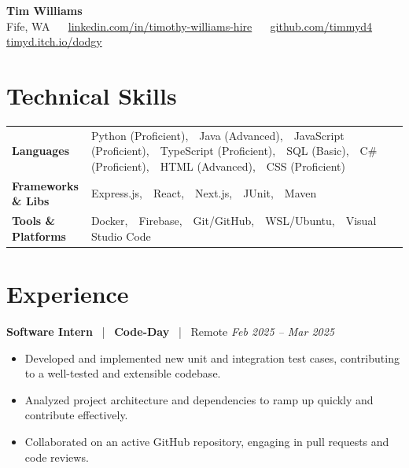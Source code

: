 \documentclass[10pt, letterpaper]{article}
\newcommand{\jobhead}[4]{%
  \vspace{5pt}%
  {\bfseries\color{dark}#1}%
  ~{\color{light}|}~%
  {\bfseries\color{navy}#2}%
  ~{\color{light}|}~%
  {\color{light}#3}%
  \hfill{\color{light}\small\textit{#4}}\\[-2pt]%
}
\newcommand{\skillrow}[2]{%
  {\bfseries #1} & #2 \\[2pt]%
}
\begin{document}

\begin{center}
  {\huge\bfseries\color{navy} Tim Williams}\\[4pt]
  {\small\color{light}
    Fife, WA
    ~\textbullet~
    \href{https://linkedin.com/in/timothy-williams-hire}{linkedin.com/in/timothy-williams-hire}
    ~\textbullet~
    \href{https://github.com/timmyd4}{github.com/timmyd4}
    ~\textbullet~
    \href{https://timyd.itch.io/dodgy}{timyd.itch.io/dodgy}
  }
\end{center}

\vspace{2pt}

\section{Technical Skills}

\begin{tabular}{@{}p{1.6in} p{5.2in}@{}}
  \skillrow{Languages}{Python (Proficient),\ \ Java (Advanced),\ \ JavaScript (Proficient),\ \ TypeScript (Proficient),\ \ SQL (Basic),\ \ C\# (Proficient),\ \ HTML (Advanced),\ \ CSS (Proficient)}
  \skillrow{Frameworks \& Libs}{Express.js,\ \ React,\ \ Next.js,\ \ JUnit,\ \ Maven}
  \skillrow{Tools \& Platforms}{Docker,\ \ Firebase,\ \ Git/GitHub,\ \ WSL/Ubuntu,\ \ Visual Studio Code}
\end{tabular}

\section{Experience}

\jobhead{Software Intern}{Code-Day}{Remote}{Feb 2025 – Mar 2025}
\begin{itemize}
  \item Developed and implemented new unit and integration test cases, contributing to a well-tested and extensible codebase.
  \item Analyzed project architecture and dependencies to ramp up quickly and contribute effectively.
  \item Collaborated on an active GitHub repository, engaging in pull requests and code reviews.
\end{itemize}
\end{document}
